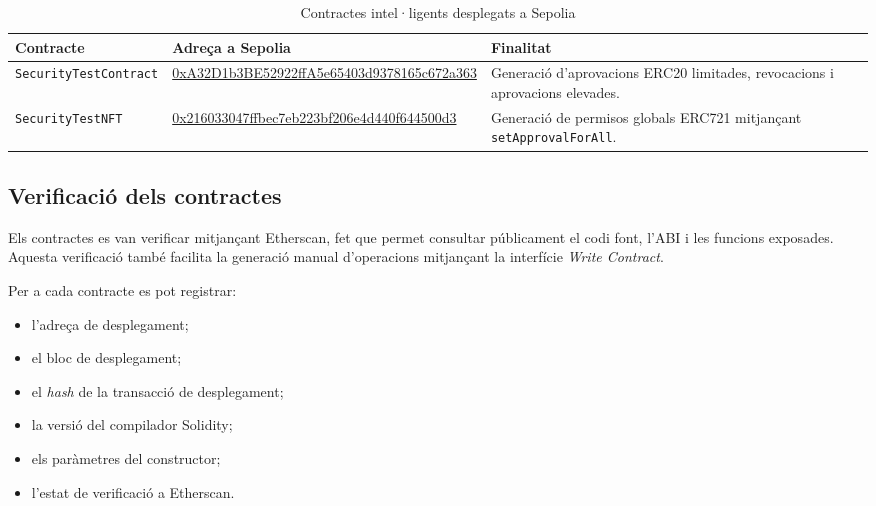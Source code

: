\begin{table}[htbp]
\centering
\small
\renewcommand{\arraystretch}{1.2}
\begin{tabularx}{\textwidth}{
    p{}
    p{}
    X
}
\hline
\textbf{Contracte} &
\textbf{Adreça a Sepolia} &
\textbf{Finalitat} \\
\hline

\texttt{SecurityTestContract} &
\url{0xA32D1b3BE52922ffA5e65403d9378165c672a363} &
Generació d’aprovacions ERC20 limitades, revocacions i aprovacions elevades. \\

\texttt{SecurityTestNFT} &
\url{0x216033047ffbec7eb223bf206e4d440f644500d3} &
Generació de permisos globals ERC721 mitjançant \texttt{setApprovalForAll}. \\

\hline
\end{tabularx}
\caption{Contractes intel·ligents desplegats a Sepolia}
\label{tab:contractes_desplegats}
\end{table}

\subsection{Verificació dels contractes}

Els contractes es van verificar mitjançant Etherscan, fet que permet consultar públicament el codi font, l’ABI i les funcions exposades. Aquesta verificació també facilita la generació manual d’operacions mitjançant la interfície \textit{Write Contract}.

Per a cada contracte es pot registrar:

\begin{itemize}
    \item l’adreça de desplegament;
    \item el bloc de desplegament;
    \item el \textit{hash} de la transacció de desplegament;
    \item la versió del compilador Solidity;
    \item els paràmetres del constructor;
    \item l’estat de verificació a Etherscan.
\end{itemize}

